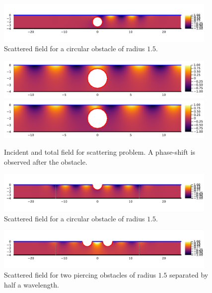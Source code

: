 \documentclass[11pt]{article}
\begin{document}
\begin{figure}
  \centering
  \includegraphics[width=0.95\textwidth]{figures/scattered_field_contour_depth_4.pdf}
  \caption{Scattered field for a circular obstacle of radius $1.5$.}
  \label{fig:scattered-submerged-contour}
\end{figure}

\begin{figure}
  \centering
  \includegraphics[width=0.95\textwidth]{figures/inc_field_contour_depth_4.pdf}\\
  \includegraphics[width=0.95\textwidth]{figures/total_field_contour_depth_4.pdf}
  \caption{Incident and total field for scattering problem. A phase-shift is observed after the obstacle.}
  \label{fig:total-incident-submerged-contour}
\end{figure}


\begin{figure}
  \centering
  \includegraphics[width=0.95\textwidth]{figures/scattered_field_contour_pierncing_depth_4.pdf}
  \caption{Scattered field for a circular obstacle of radius $1.5$.}
  \label{fig:scattered-piercing-contour}
\end{figure}


\begin{figure}
  \centering
  \includegraphics[width=0.95\textwidth]{figures/scattered_field_contour_two_pierncing_depth_4.pdf}
  \caption{Scattered field for two piercing obstacles of radius $1.5$ separated by half a wavelength.}
  \label{fig:scattered-two-piercing-contour}
\end{figure}
\end{document}
